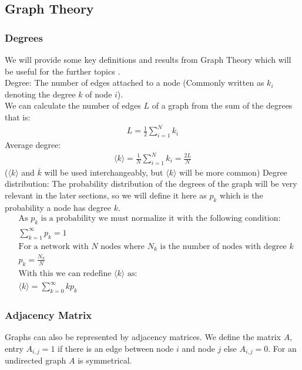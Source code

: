 \documentclass{article}
\begin{document}
        \subsection{Graph Theory}
            \subsubsection{Degrees}
            We will provide some key definitions and results from Graph Theory which will be useful for the further topics \parencite{barabasi2013network}.\\
            Degree: The number of edges attached to a node (Commonly written as $k_i$ denoting the degree $k$ of node $i$).\\ 
            We can calculate the number of edges $L$ of a graph from the sum of the degrees that is: 
            \begin{align*}
                L=\frac{1}{2}\sum_{i=1}^{N} k_{i}
            \end{align*}
            Average degree:
            \begin{align*}
                \langle k \rangle = \frac{1}{N} \sum_{i=1}^{N}k_{i} = \frac{2L}{N}
            \end{align*}
            ($\langle k \rangle$ and $\overline{k}$ will be used interchangeably, but $\langle k \rangle$ will be more common)
            Degree distribution: The probability distribution of the degrees of the graph will be very relevant in the later sections, so we will define it here as $p_k$ which is the probability a node has degree $k$.
            \begin{align*}
                &\text{As $p_k$ is a probability we must normalize it with the following condition:}\\
                &\sum_{k=1}^{\infty}p_{k} = 1\\
                &\text{For a network with $N$ nodes where $N_k$ is the number of nodes with degree $k$}\\
                &p_{k} = \frac{N_k}{N}\\
                &\text{With this we can redefine $\langle k \rangle$ as:}\\
                &\langle k \rangle = \sum_{k=0}^{\infty}kp_{k}
            \end{align*}
        \subsubsection{Adjacency Matrix}
            Graphs can also be represented by adjacency matrices. We define the matrix $A$, entry $A_{i,j} = 1$ if there is an edge between node $i$ and node $j$ else $A_{i,j} = 0$. For an undirected graph $A$ is symmetrical.\\
\end{document}

